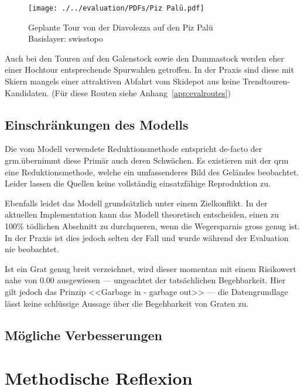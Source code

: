 \begin{figure}[ht]
  \centering
  \texttt{[image: ./../evaluation/PDFs/Piz Palü.pdf]}
  \caption{Geplante Tour von der Diavolezza auf den Piz Palü\\Basislayer: swisstopo}\label{fig:pizpalu}
\end{figure}

Auch bei den Touren auf den Galenstock sowie den Dammastock werden eher einer Hochtour entsprechende Spurwahlen getroffen. In der Praxis sind diese mit Skiern mangels einer attraktiven Abfahrt vom Skidepot aus keine Trendtouren-Kandidaten. (Für diese Routen siehe Anhang\ \ref{app:evalroutes})

\clearpage

\subsection{Einschränkungen des Modells}
Die vom Modell verwendete Reduktionsmethode entspricht de-facto der \gls{grm}.\@So übernimmt diese Primär auch deren Schwächen. Es existieren mit der \gls{qrm} eine Reduktionsmethode, welche ein umfassenderes Bild des Geländes beobachtet.\cite{qrm}
Leider lassen die Quellen keine vollständig einsatzfähige Reproduktion zu.

Ebenfalls leidet das Modell grundsätzlich unter einem Zielkonflikt. In der aktuellen Implementation kann das Modell theoretisch entscheiden, einen zu 100\% tödlichen Abschnitt zu durchqueren, wenn die Wegersparnis gross genug ist. In der Praxis ist dies jedoch selten der Fall und wurde während der Evaluation nie beobachtet.

Ist ein Grat genug breit verzeichnet, wird dieser momentan mit einem Risikowert nahe von $0.00$ ausgewiesen --- ungeachtet der tatsächlichen Begehbarkeit. Hier gilt jedoch das Prinzip <<Garbage in - garbage out>> --- die Datengrundlage lässt keine schlüssige Aussage über die Begehbarkeit von Graten zu.

\subsection{Mögliche Verbesserungen}


\clearpage
\section{Methodische Reflexion}
